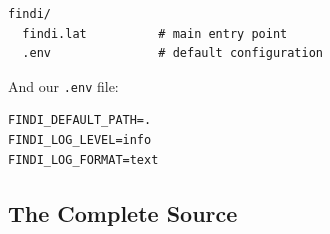 \begin{lstlisting}[language={}, caption={Project structure}]
findi/
  findi.lat          # main entry point
  .env               # default configuration
\end{lstlisting}

And our \texttt{.env} file:

\begin{lstlisting}[language={}, caption={Default .env configuration}]
FINDI_DEFAULT_PATH=.
FINDI_LOG_LEVEL=info
FINDI_LOG_FORMAT=text
\end{lstlisting}

\subsection{The Complete Source}\label{sec:cli-complete-source}

